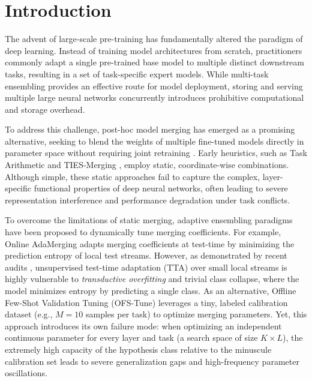 \section{Introduction}
\label{sec:intro}

The advent of large-scale pre-training has fundamentally altered the paradigm of deep learning. Instead of training model architectures from scratch, practitioners commonly adapt a single pre-trained base model to multiple distinct downstream tasks, resulting in a set of task-specific expert models. While multi-task ensembling provides an effective route for model deployment, storing and serving multiple large neural networks concurrently introduces prohibitive computational and storage overhead. 

To address this challenge, post-hoc model merging has emerged as a promising alternative, seeking to blend the weights of multiple fine-tuned models directly in parameter space without requiring joint retraining \cite{wortsman2022model, ilharco2022editing}. Early heuristics, such as Task Arithmetic \cite{ilharco2022editing} and TIES-Merging \cite{yadav2023ties}, employ static, coordinate-wise combinations. Although simple, these static approaches fail to capture the complex, layer-specific functional properties of deep neural networks, often leading to severe representation interference and performance degradation under task conflicts.

To overcome the limitations of static merging, adaptive ensembling paradigms have been proposed to dynamically tune merging coefficients. For example, Online AdaMerging \cite{yang2023adamerging} adapts merging coefficients at test-time by minimizing the prediction entropy of local test streams. However, as demonstrated by recent audits \cite{suitemerge2025}, unsupervised test-time adaptation (TTA) over small local streams is highly vulnerable to \emph{transductive overfitting} and trivial class collapse, where the model minimizes entropy by predicting a single class. As an alternative, Offline Few-Shot Validation Tuning (OFS-Tune) leverages a tiny, labeled calibration dataset (e.g., $M=10$ samples per task) to optimize merging parameters. Yet, this approach introduces its own failure mode: when optimizing an independent continuous parameter for every layer and task (a search space of size $K \times L$), the extremely high capacity of the hypothesis class relative to the minuscule calibration set leads to severe generalization gaps and high-frequency parameter oscillations.

